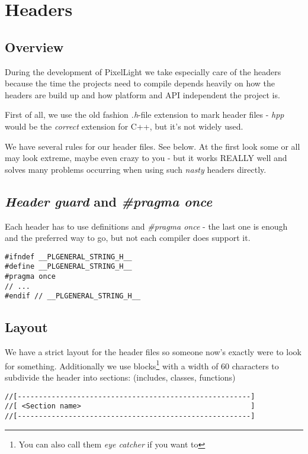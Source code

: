 \chapter{Headers}




\section{Overview}
During the development of PixelLight we take especially care of the headers because the time the projects need to compile depends heavily on how the headers are build up and how platform and API independent the project is.

First of all, we use the old fashion \emph{.h}-file extension to mark header files - \emph{hpp} would be the \emph{correct} extension for C++, but it's not widely used.

We have several rules for our header files. See below. At the first look some or all may look extreme, maybe even crazy to you - but it works REALLY well and solves many problems occurring when using such \emph{nasty} headers directly.




\section{\emph{Header guard} and \emph{\#pragma once}}
Each header has to use definitions and \emph{\#pragma once} - the last one is enough and the preferred way to go, but not each compiler does support it.

\begin{lstlisting}[caption=Header guard]
#ifndef __PLGENERAL_STRING_H__
#define __PLGENERAL_STRING_H__
#pragma once
// ...
#endif // __PLGENERAL_STRING_H__
\end{lstlisting}




\section{Layout}
We have a strict layout for the header files so someone now's exactly were to look for something. Additionally we use blocks\footnote{You can also call them \emph{eye catcher} if you want to} with a width of 60 characters to subdivide the header into sections: (includes, classes, functions)

\begin{lstlisting}[caption=Code section comment blocks]
//[-------------------------------------------------------]
//[ <Section name>                                        ]
//[-------------------------------------------------------]
\end{lstlisting}

